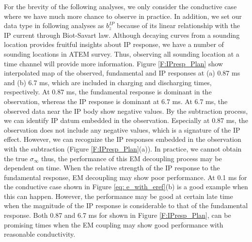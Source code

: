 \documentclass[a4paper, 11pt]{article}
\newcommand{\siginf}{\sigma_\infty}
\newcommand{\bzip}{b_z^{IP}}
\begin{document}
For the brevity of the following analyses, we only consider the conductive case where we have much more chance to observe in practice. 
In addition, we set our data type in following analyses as $\bzip$ because of its linear relationship with the IP current through Biot-Savart law. 
Although decaying curves from a sounding location provides fruitful insights about IP response, we have a number of sounding locations in ATEM survey. 
Thus, observing all sounding location at a time channel will provide more information.  
Figure \ref{F:IPresp_Plan} show interpolated map of the observed, fundamental and IP responses at (a) 0.87 ms and (b) 6.7 ms, which are included in charging and discharging times, respectively. 
At 0.87 ms, the fundamental response is dominant in the observation, whereas the IP response is dominant at 6.7 ms.
At 6.7 ms, the observed data near the IP body show negative values. 
By the subtraction process, we can identify IP datum embedded in the observation.
Especially at 0.87 ms, the observation does not include any negative values, which is a signature of the IP effect. 
However, we can recognize the IP responses embedded in the observation with the subtraction (Figure \ref{F:IPresp_Plan}(a)). 
In practice, we cannot obtain the true $\siginf$ thus, the performance of this EM decoupling process may be dependent on time. 
When the relative strength of the IP response to the fundamental response, EM decoupling may show poor performance. 
At 0.1 ms for the conductive case shown in Figure \ref{eq: e_with_eref}(b) is a good example when this can happen. 
However, the performance may be good at certain late time when the magnitude of the IP response is considerable to that of the fundamental response. 
Both 0.87 and 6.7 ms for shown in Figure \ref{F:IPresp_Plan}, can be promising times when the EM coupling may show good performance with reasonable conductivity. 
\end{document}
